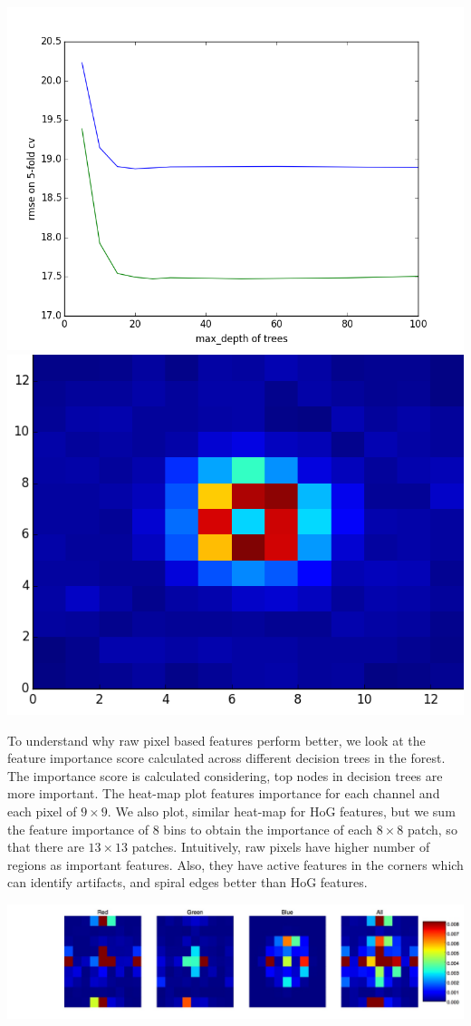 \documentclass[landscape,a0paper,fontscale=0.292]{baposter}
\begin{document}
\begin{poster}
{	\includegraphics[width=0.4\linewidth]{HoGVsRawFeats.png}   
	\includegraphics[width=0.35\linewidth]{HoGHeatMap.png}  
	
	To understand why raw pixel based features perform better, we look at the feature importance score calculated across different decision trees in the forest. The importance score is calculated considering, top nodes in decision trees are more important. The heat-map plot features importance for each channel and each pixel of $9 \times 9$. We also plot, similar heat-map for HoG features, but we sum the feature importance of 8 bins to obtain the importance of each $8 \times 8$ patch, so that there are $13 \times 13$ patches. Intuitively, raw pixels have higher number of regions as important features. Also, they have active features in the corners which can identify artifacts, and spiral edges better than HoG features.
	
	\includegraphics[width=0.8\linewidth]{heat_map_raw_rgba.jpg}  
   
   }


\end{poster}
\end{document}
